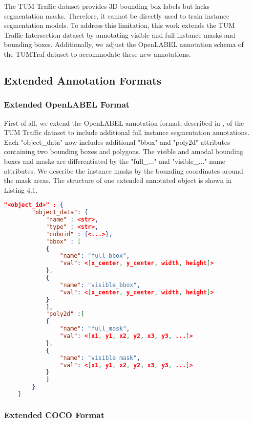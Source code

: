 The TUM Traffic dataset provides 3D bounding box labels but lacks segmentation masks. Therefore, it cannot be directly used to train instance segmentation models. To address this limitation, this work extends the TUM Traffic Intersection dataset by annotating visible and full instance masks and bounding boxes. Additionally, we adjust the OpenLABEL annotation schema of the TUMTraf dataset to accommodate these new annotations. 

\subsection{Extended Annotation Formats}  \label{sec:extended_openlabel_format}

\subsubsection{Extended OpenLABEL Format}  

First of all, we extend the OpenLABEL annotation format, described in , of the TUM Traffic dataset to include additional full instance segmentation annotations. Each "object\_data" now includes additional "bbox" and "poly2d" attributes containing two bounding boxes and polygons. The visible and amodal bounding boxes and masks are differentiated by the "full\_..." and "visible\_..." name attributes. We describe the instance masks by the bounding coordinates around the mask areas. The structure of one extended annotated object is shown in Listing 4.1. 

\begin{lstlisting}[language=json, caption={Illutration of the extended OpenLABEL Annotation JSON Structure}]
	"<object_id>" : {
		"object_data": {
			"name" : <str>, 
			"type" : <str>, 
			"cuboid" : {<...>},
			"bbox" : [ 
			{
				"name": "full_bbox",
				"val": <[x_center, y_center, width, height]>
			}, 
			{	
				"name": "visible_bbox",
				"val": <[x_center, y_center, width, height]>
			}
			], 
			"poly2d" :[ 
			{
				"name": "full_mask",
				"val": <[x1, y1, x2, y2, x3, y3, ...]>
			}, 
			{	
				"name": "visible_mask",
				"val": <[x1, y1, x2, y2, x3, y3, ...]>
			}
			] 
		}
	}
\end{lstlisting}

\subsubsection{Extended COCO Format}  

